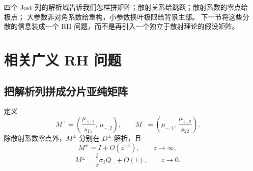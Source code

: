 \documentclass[lang=cn,scheme=chinese,mode=simple,device=normal,color=blue,
math=cm,thmcnt=section,12pt]{elegantbook}
\newcommand{\eqq}[2]{\tag{#1}\label{eq:#1}#2}
\begin{document}
\begin{callout}
    四个 Jost 列的解析域告诉我们怎样拼矩阵；散射关系给跳跃；散射系数的零点给极点；
    大参数非对角系数给重构，小参数换叶极限给背景主部。
    下一节将这些分散的信息装成一个 RH 问题，而不是再引入一个独立于散射理论的假设矩阵。
\end{callout}

\section{相关广义 RH 问题}
\subsection{把解析列拼成分片亚纯矩阵}
定义
\begin{equation}\eqq{6.5.1}{M^+=(\dfrac{\mu_{+,1}}{s_{11}},\,\mu_{-,2}),\qquad
        M^-=(\mu_{-,1},\,\dfrac{\mu_{+,2}}{s_{22}}).}\end{equation}
除散射系数零点外，$M^\pm$ 分别在 $D^\pm$ 解析，且
\begin{equation}\eqq{6.5.2}{M^\pm=I+O(z^{-1}),\qquad z\to\infty,}\end{equation}
\begin{equation}\eqq{6.5.3}{M^\pm=\dfrac{i}{z}\sigma_3Q_-+O(1),\qquad z\to0.}\end{equation}
\end{document}
